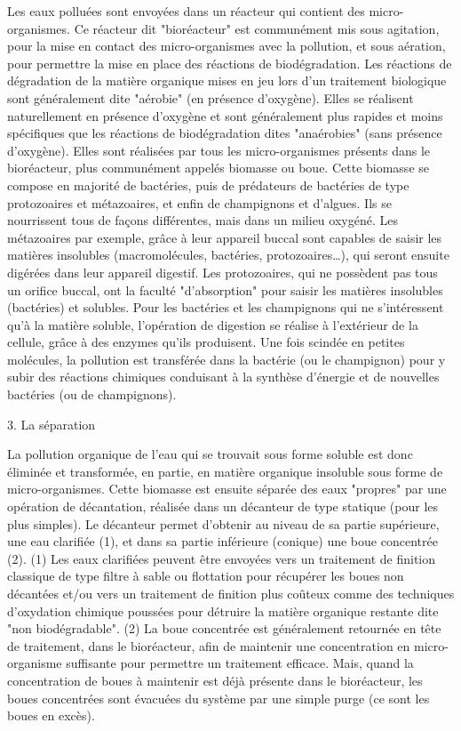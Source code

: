 Les eaux polluées sont envoyées dans un réacteur qui contient des micro-organismes. Ce réacteur dit "bioréacteur" est communément mis sous agitation, pour la mise en contact des micro-organismes avec la pollution, et sous aération, pour permettre la mise en place des réactions de biodégradation. Les réactions de dégradation de la matière organique mises en jeu lors d'un traitement biologique sont généralement dite "aérobie" (en présence d'oxygène). Elles se réalisent naturellement en présence d'oxygène et sont généralement plus rapides et moins spécifiques que les réactions de biodégradation dites "anaérobies" (sans présence d'oxygène). Elles sont réalisées par tous les micro-organismes présents dans le bioréacteur, plus communément appelés biomasse ou boue. Cette biomasse se compose en majorité de bactéries, puis de prédateurs de bactéries de type protozoaires et métazoaires, et enfin de champignons et d'algues. Ils se nourrissent tous de façons différentes, mais dans un milieu oxygéné. Les métazoaires par exemple, grâce à leur appareil buccal sont capables de saisir les matières insolubles (macromolécules, bactéries, protozoaires…), qui seront ensuite digérées dans leur appareil digestif. Les protozoaires, qui ne possèdent pas tous un orifice buccal, ont la faculté "d'absorption" pour saisir les matières insolubles (bactéries) et solubles. Pour les bactéries et les champignons qui ne s'intéressent qu'à la matière soluble, l'opération de digestion se réalise à l'extérieur de la cellule, grâce à des enzymes qu'ils produisent. Une fois scindée en petites molécules, la pollution est transférée dans la bactérie (ou le champignon) pour y subir des réactions chimiques conduisant à la synthèse d'énergie et de nouvelles bactéries (ou de champignons). 
 \vspace{0.3 cm}

3. La séparation
\vspace{0.3 cm}

La pollution organique de l'eau qui se trouvait sous forme soluble est donc éliminée et transformée, en partie, en matière organique insoluble sous forme de micro-organismes. Cette biomasse est ensuite séparée des eaux "propres" par une opération de décantation, réalisée dans un décanteur de type statique (pour les plus simples). Le décanteur permet d'obtenir au niveau de sa partie supérieure, une eau clarifiée (1), et dans sa partie inférieure (conique) une boue concentrée (2). 
(1) Les eaux clarifiées peuvent être envoyées vers un traitement de finition classique de type filtre à sable ou flottation pour récupérer les boues non décantées et/ou vers un traitement de finition plus coûteux comme des techniques d'oxydation chimique poussées pour détruire la matière organique restante dite "non biodégradable".
(2) La boue concentrée est généralement retournée en tête de traitement, dans le bioréacteur, afin de maintenir une concentration en micro-organisme suffisante pour permettre un traitement efficace. Mais, quand la concentration de boues à maintenir est déjà présente dans le bioréacteur, les boues concentrées sont évacuées du système par une simple purge (ce sont les boues en excès). 

